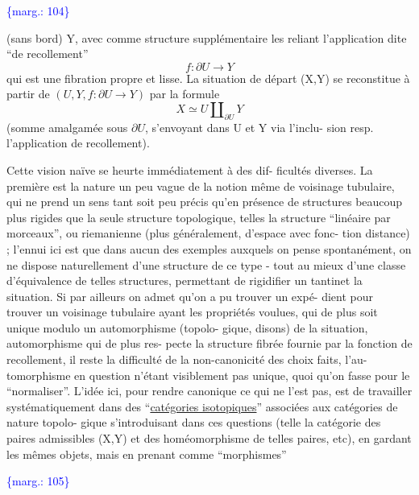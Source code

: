 \documentclass[11pt]{article}
\newcommand{\scanpage}[1]{\par\bigskip\noindent{\small\sffamily[scan #1]}\par}
\newcommand{\mspage}[1]{{\small\sffamily[p.\,#1]}}
\newcommand{\margin}[1]{\textcolor{blue}{\{\textsf{marg.:} #1\}}}
\newcommand{\uline}[1]{\underline{#1}}
\begin{document}
\margin{104}

\clearpage
\scanpage{119/105}
\mspage{27}

(sans bord)  Y, avec comme structure supplémentaire les reliant
l'application dite ``de recollement''
\[ f : \partial U \longrightarrow Y \]
qui est une fibration propre et lisse. La situation de départ
(X,Y)  se reconstitue à partir de  $(U,Y, f : \partial U \longrightarrow Y)$  par la
formule
\[ X \simeq U \amalg_{\partial U} Y \]
(somme amalgamée sous  $\partial U$, s'envoyant dans  U  et  Y  via l'inclu-%
sion resp. l'application de recollement).

Cette vision naïve se heurte immédiatement à des dif-%
ficultés diverses. La première est la nature un peu vague de la
notion même de voisinage tubulaire, qui ne prend un sens tant soit
peu précis qu'en présence de structures beaucoup plus rigides que
la seule structure topologique, telles la structure ``linéaire par
morceaux'', ou riemanienne (plus généralement, d'espace avec fonc-%
tion distance) ; l'ennui ici est que dans aucun des exemples
auxquels on pense spontanément, on ne dispose naturellement d'une
structure de ce type - tout au mieux d'une classe d'équivalence
de telles structures, permettant de rigidifier un tantinet la
situation. Si par ailleurs on admet qu'on a pu trouver un expé-%
dient pour trouver un voisinage tubulaire ayant les propriétés
voulues, qui de plus soit unique modulo un automorphisme (topolo-%
gique, disons) de la situation, automorphisme qui de plus res-%
pecte la structure fibrée fournie par la fonction de recollement,
il reste la difficulté de la non-canonicité des choix faits, l'au-%
tomorphisme en question n'étant visiblement pas unique, quoi qu'on
fasse pour le ``normaliser''. L'idée ici, pour rendre canonique ce
qui ne l'est pas, est de travailler systématiquement dans des
``\uline{catégories isotopiques}'' associées aux catégories de nature topolo-%
gique s'introduisant dans ces questions (telle la catégorie des
paires admissibles  (X,Y)  et des homéomorphisme de telles paires,
etc), en gardant les mêmes objets, mais en prenant comme ``morphismes''

\margin{105}
\end{document}
